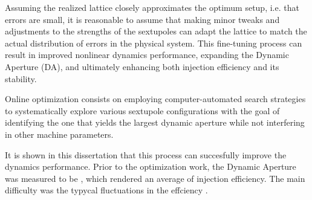 Assuming the realized lattice closely approximates the optimum setup, i.e. that errors are small, it is reasonable to assume that making minor tweaks and adjustments to the strengths of the sextupoles can adapt the lattice to match the actual distribution of errors in the physical system. This fine-tuning process can result in improved nonlinear dynamics performance, expanding the Dynamic Aperture (DA), and ultimately enhancing both injection efficiency and its stability.

Online optimization consists on employing computer-automated search strategies to systematically explore various sextupole configurations with the goal of identifying the one that yields the largest dynamic aperture while not interfering in other machine parameters.

It is shown in this dissertation that this process can succesfully improve the dynamics performance. Prior to the optimization work, the Dynamic Aperture was measured to be , which rendered an average of  injection efficiency. The main difficulty was the typycal fluctuations in the effciency .
